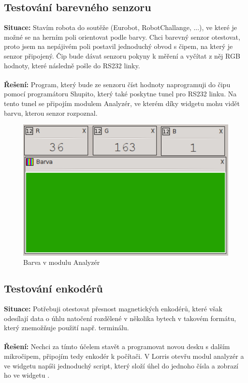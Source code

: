 \documentclass[12pt, a4paper, oneside]{article}
\begin{document}
\subsection{Testování barevného senzoru}
{\bf Situace:} Stavím robota do soutěže (Eurobot, RobotChallange, ...), ve které je možné se na herním poli orientovat podle barvy. Chci barevný senzor otestovat, proto jsem na nepájivém poli postavil jednoduchý obvod s čipem, na který je senzor připojený. Čip bude dávat senzoru pokyny k měření a vyčítat z něj RGB hodnoty, které následně pošle do RS232 linky.\\
\\
{\bf Řešení:} Program, který bude ze senzoru číst hodnoty naprogramuji do čipu pomocí programátoru Shupito, který také poskytne tunel pro RS232 linku. Na tento tunel se připojím modulem Analyzér, ve kterém díky widgetu  mohu vidět barvu, kterou senzor rozpoznal.

\begin{figure}[h]
\begin{center}
\includegraphics{img/use_color.png}
\caption{Barva v modulu Analyzér}
\label{Terminal}
\end{center}
\end{figure}

\newpage
\subsection{Testování enkodérů}
{\bf Situace:} Potřebuji otestovat přesnost magnetických enkodérů, které však odesílají data o úhlu natočení rozdělené v několika bytech v takovém formátu, který znemožňuje použití např. terminálu.\\
\\
{\bf Řešení:} Nechci za tímto účelem stavět a programovat novou desku s dalším mikročipem, připojím tedy enkodér k počítači. V Lorris otevřu modul analyzér a ve widgetu  napíši  jednoduchý script, který složí úhel do jednoho čísla a zobrazí ho ve widgetu .
\end{document}
